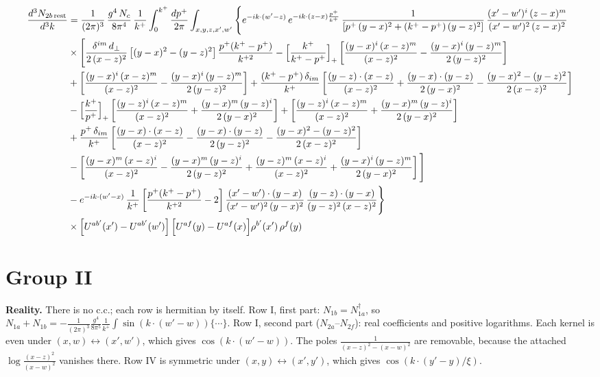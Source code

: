 \documentclass[9pt]{article}
\numberwithin{equation}{section}
\begin{document}
\begin{align}
\frac{d^{3}N_{2b\,\rm rest}}{d^{3}k} & =\frac{1}{(2\pi)^{3}}\,\frac{g^{4}\,N_{c}}{8\pi^{4}}\,\frac{1}{k^{+}}\int_{0}^{k^{+}}\frac{dp^{+}}{2\pi}\int_{x,y,z,x',w'}\Bigg\{e^{-ik\cdot(w'-z)}\,e^{-ik\cdot(z-x)\frac{p^{+}}{k^{+}}}\,\frac{1}{\left[p^{+}\,(y-x)^{2}+(k^{+}-p^{+})\,(y-z)^{2}\right]}\,\frac{(x'-w')^{i}\,(z-x)^{m}}{(x'-w')^{2}\,(z-x)^{2}}\notag\\
&\times\Bigg[\frac{\delta^{im}\,d_{\perp}}{2\,(x-z)^{2}}\left[(y-x)^{2}-(y-z)^{2}\right]\frac{p^{+}(k^{+}-p^{+})}{k^{+2}}
-\Big[\frac{k^{+}}{k^{+}-p^{+}}\Big]_{+}\left[\frac{(y-x)^{i}\,(x-z)^{m}}{(x-z)^{2}}-\frac{(y-x)^{i}\,(y-z)^{m}}{2\,(y-z)^{2}}\right]\notag\\
&+\left[\frac{(y-x)^{i}\,(x-z)^{m}}{(x-z)^{2}}-\frac{(y-x)^{i}\,(y-z)^{m}}{2\,(y-z)^{2}}\right]
+\frac{(k^{+}-p^{+})\,\delta_{im}}{k^{+}}\left[\frac{(y-z)\cdot(x-z)}{(x-z)^{2}}+\frac{(y-x)\cdot(y-z)}{2\,(y-x)^{2}}-\frac{(y-x)^{2}-(y-z)^{2}}{2\,(x-z)^{2}}\right]\notag\\
&-\Big[\frac{k^{+}}{p^{+}}\Big]_{+}\left[\frac{(y-z)^{i}\,(x-z)^{m}}{(x-z)^{2}}+\frac{(y-x)^{m}\,(y-z)^{i}}{2\,(y-x)^{2}}\right]+\left[\frac{(y-z)^{i}\,(x-z)^{m}}{(x-z)^{2}}+\frac{(y-x)^{m}\,(y-z)^{i}}{2\,(y-x)^{2}}\right]\notag\\
&+\frac{p^{+}\,\delta_{im}}{k^{+}}\left[\frac{(y-x)\cdot(x-z)}{(x-z)^{2}}-\frac{(y-x)\cdot(y-z)}{2\,(y-z)^{2}}-\frac{(y-x)^{2}-(y-z)^{2}}{2\,(x-z)^{2}}\right]\notag\\
&-\left[\frac{(y-x)^{m}\,(x-z)^{i}}{(x-z)^{2}}-\frac{(y-x)^{m}\,(y-z)^{i}}{2\,(y-z)^{2}}+\frac{(y-z)^{m}\,(x-z)^{i}}{(x-z)^{2}}+\frac{(y-x)^{i}\,(y-z)^{m}}{2\,(y-x)^{2}}\right]\Bigg]\notag\\
&-e^{-ik\cdot(w'-x)}\,\frac{1}{k^{+}}\left[\frac{p^{+}(k^{+}-p^{+})}{k^{+2}}-2\right]\frac{(x'-w')\cdot(y-x)}{(x'-w')^{2}\,(y-x)^{2}}\,\frac{(y-z)\cdot(y-x)}{(y-z)^{2}\,(x-z)^{2}}\Bigg\}\notag\\
&\times\Big[U^{ab'}(x')-U^{ab'}(w')\Big]\,\Big[U^{af}(y)-U^{af}(x)\Big]\rho^{b'}(x')\,\rho^{f}(y)
\end{align}

\section{Group II}
{\color{red}\textbf{Reality.} There is no c.c.; each row is hermitian by itself. Row I, first part: $N_{1b}=N_{1a}^{\dagger}$, so $N_{1a}+N_{1b}=-\frac{1}{(2\pi)^{3}}\frac{g^{4}}{8\pi^{5}}\frac{1}{k^{+}}\int\sin(k\cdot(w'-w))\{\cdots\}$. Row I, second part ($N_{2a}$--$N_{2f}$): real coefficients and positive logarithms. Each kernel is even under $(x,w)\leftrightarrow(x',w')$, which gives $\cos(k\cdot(w'-w))$. The poles $\frac{1}{(x-z)^{2}-(x-w)^{2}}$ are removable, because the attached $\log\frac{(x-z)^{2}}{(x-w)^{2}}$ vanishes there. Row IV is symmetric under $(x,y)\leftrightarrow(x',y')$, which gives $\cos(k\cdot(y'-y)/\xi)$.}
\end{document}
